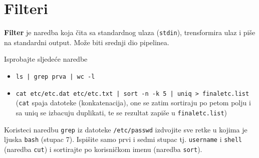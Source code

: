 \section{Filteri}
\textbf{Filter} je naredba koja čita sa standardnog ulaza (\texttt{stdin}), trensformira ulaz i piše na standardni output. Može biti srednji dio pipelinea.

\begin{primjer} Isprobajte sljedeće naredbe
\begin{itemize}
\item \texttt{ls | grep prva | wc -l }
\item \texttt{cat etc/etc.dat etc/etc.txt | sort -n -k 5 | uniq > finaletc.list}  (\texttt{cat} spaja datoteke (konkatenacija), one se zatim sortiraju po petom polju i sa uniq se izbacuju duplikati, te se rezultat zapiše u \texttt{finaletc.list})
\end{itemize}
\end{primjer}

\begin{zadatak} 
Koristeci naredbu \texttt{grep} iz datoteke \texttt{/etc/passwd} izdvojite sve retke u kojima je ljuska \texttt{bash} (stupac 7). Ispišite samo prvi i sedmi stupac tj. \texttt{username} i \texttt{shell} (naredba \texttt{cut}) i sortirajte po korisničkom imenu (naredba \texttt{sort}). 
\end{zadatak}

\begin{comment}

\vfill
\begin{itemize}
\renewcommand{\labelitemi}{\textbf{$\rightarrow$}}
\item Popis svih pokrenutih naredbi eksportirajte u datoteku imena \texttt{prezime\_ime\_vj6.txt}. Uploadajte datoteku na \href{https://moodle.oss.unist.hr/course/view.php?id=133}{http://moodle.oss.unist.hr}.
\end{itemize}

\end{comment}


